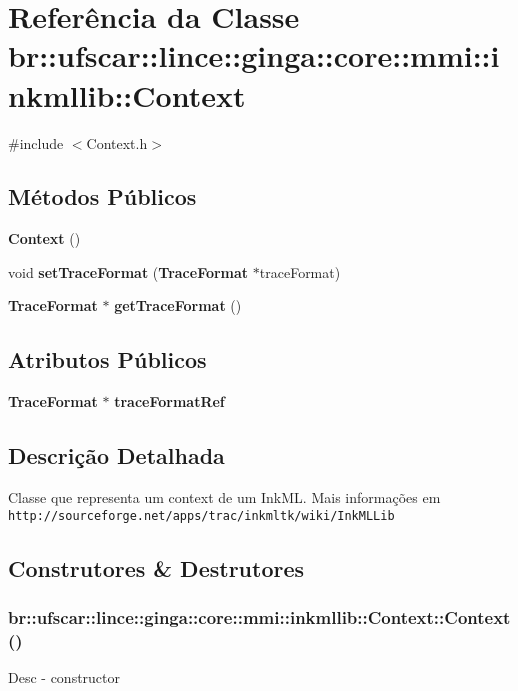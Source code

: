 \section{Referência da Classe br::ufscar::lince::ginga::core::mmi::inkmllib::Context}
\label{classbr_1_1ufscar_1_1lince_1_1ginga_1_1core_1_1mmi_1_1inkmllib_1_1Context}


{\ttfamily \#include $<$Context.h$>$}

\subsection*{Métodos Públicos}
\begin{DoxyCompactItemize}
\item 
{\bf Context} ()
\item 
void {\bf setTraceFormat} ({\bf TraceFormat} $\ast$traceFormat)
\item 
{\bf TraceFormat} $\ast$ {\bf getTraceFormat} ()
\end{DoxyCompactItemize}
\subsection*{Atributos Públicos}
\begin{DoxyCompactItemize}
\item 
{\bf TraceFormat} $\ast$ {\bf traceFormatRef}
\end{DoxyCompactItemize}


\subsection{Descrição Detalhada}
Classe que representa um context de um InkML. Mais informações em {\tt http://sourceforge.net/apps/trac/inkmltk/wiki/InkMLLib} 

\subsection{Construtores \& Destrutores}
\subsubsection[{Context}]{\setlength{\rightskip}{0pt plus 5cm}br::ufscar::lince::ginga::core::mmi::inkmllib::Context::Context ()\hspace{0.3cm}{\ttfamily  [inline]}}\label{classbr_1_1ufscar_1_1lince_1_1ginga_1_1core_1_1mmi_1_1inkmllib_1_1Context_a0e15f65b9c181a4f1a05ac0b0484cec7}
Desc -\/ constructor 

